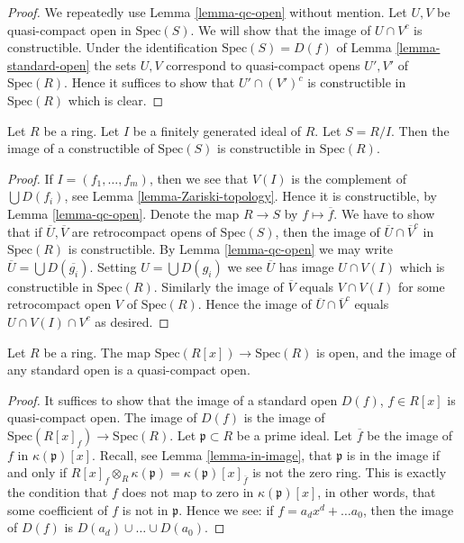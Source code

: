 \begin{proof}
We repeatedly use Lemma \ref{lemma-qc-open} without mention.
Let $U, V$ be quasi-compact open in $\text{Spec}(S)$.
We will show that the image of $U \cap V^c$ is constructible.
Under the identification
$\text{Spec}(S) = D(f)$ of Lemma \ref{lemma-standard-open}
the sets $U, V$ correspond to quasi-compact opens
$U', V'$ of $\text{Spec}(R)$.
Hence it suffices to show that $U' \cap (V')^c$
is constructible in $\text{Spec}(R)$ which is clear.
\end{proof}

\begin{lemma}
\label{lemma-closed-fp}
Let $R$ be a ring.
Let $I$ be a finitely generated ideal of $R$.
Let $S = R/I$.
Then the image of a constructible of $\text{Spec}(S)$
is constructible in $\text{Spec}(R)$.
\end{lemma}

\begin{proof}
If $I = (f_1, \ldots, f_m)$, then we see that
$V(I)$ is the complement of $\bigcup D(f_i)$,
see Lemma \ref{lemma-Zariski-topology}.
Hence it is constructible, by Lemma \ref{lemma-qc-open}.
Denote the map $R \to S$ by $f \mapsto \overline{f}$.
We have to show that if $\overline{U}, \overline{V}$
are retrocompact opens of $\text{Spec}(S)$, then the
image of $\overline{U} \cap \overline{V}^c$
in $\text{Spec}(R)$ is constructible.
By Lemma \ref{lemma-qc-open} we may write
$\overline{U} = \bigcup D(\overline{g_i})$.
Setting $U = \bigcup D({g_i})$ we see $\overline{U}$
has image $U \cap V(I)$ which is constructible in
$\text{Spec}(R)$. Similarly the image of $\overline{V}$ equals
$V \cap V(I)$ for some retrocompact open $V$ of $\text{Spec}(R)$.
Hence the image of $\overline{U} \cap \overline{V}^c$
equals $U \cap V(I) \cap V^c$ as desired.
\end{proof}

\begin{lemma}
\label{lemma-affineline-open}
Let $R$ be a ring. The map $\text{Spec}(R[x]) \to \text{Spec}(R)$
is open, and the image of any standard open is a quasi-compact
open.
\end{lemma}

\begin{proof}
It suffices to show that the image of a standard open
$D(f)$, $f\in R[x]$ is quasi-compact open.
The image of $D(f)$ is the image of
$\text{Spec}(R[x]_f) \to \text{Spec}(R)$.
Let $\mathfrak p \subset R$ be a prime ideal.
Let $\overline{f}$ be the image of $f$ in
$\kappa(\mathfrak p)[x]$.
Recall, see Lemma \ref{lemma-in-image},
that $\mathfrak p$ is in the image
if and only if $R[x]_f \otimes_R \kappa(\mathfrak p) =
\kappa(\mathfrak p)[x]_{\overline{f}}$ is not the
zero ring. This is exactly the condition that $f$ does not map
to zero in $\kappa(\mathfrak p)[x]$, in other words, that
some coefficient of $f$ is not in $\mathfrak p$.
Hence we see: if $f = a_d x^d + \ldots a_0$, then
the image of $D(f)$ is $D(a_d) \cup \ldots \cup D(a_0)$.
\end{proof}

